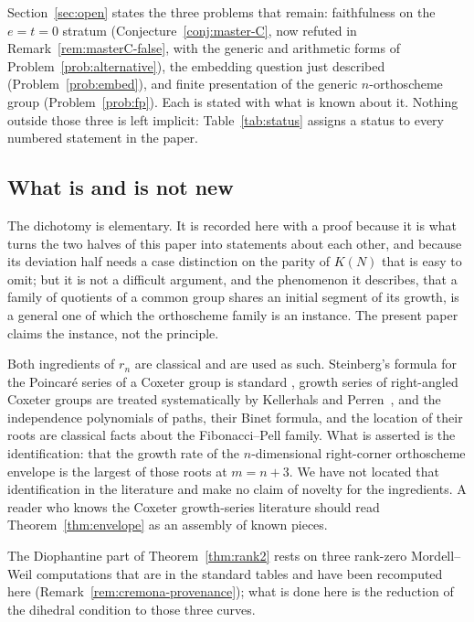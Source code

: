 \documentclass[11pt,a4paper]{article}
\theoremstyle{definition}
\theoremstyle{remark}
\theoremstyle{plain}
\begin{document}
Section~\ref{sec:open} states the three problems that remain: faithfulness on the $e=t=0$
stratum (Conjecture~\ref{conj:master-C}, now refuted in Remark~\ref{rem:masterC-false}, with
the generic and arithmetic forms of Problem~\ref{prob:alternative}), the embedding question
just described
(Problem~\ref{prob:embed}), and finite presentation of the generic $n$-orthoscheme group
(Problem~\ref{prob:fp}). Each is stated with what is known about it. Nothing outside those
three is left implicit: Table~\ref{tab:status} assigns a status to every numbered statement in
the paper.

\subsection{What is and is not new}

The dichotomy is elementary. It is recorded here with a proof because it is what turns the two
halves of this paper into statements about each other, and because its deviation half needs a
case distinction on the parity of $K(N)$ that is easy to omit; but it is not a difficult
argument, and the phenomenon it describes, that a family of quotients of a common group shares
an initial segment of its growth, is a general one of which the orthoscheme family is an
instance. The present paper claims the instance, not the principle.

Both ingredients of $r_n$ are classical and are used as such. Steinberg's formula for the
Poincar\'e series of a Coxeter group is standard \cite{Steinberg,humphreys90,Bourbaki}, growth
series of right-angled Coxeter groups are treated systematically by Kellerhals and
Perren~\cite{kellerhals-perren}, and the independence polynomials of paths, their Binet formula,
and the location of their roots are classical facts about the Fibonacci--Pell family. What is
asserted is the identification: that the growth rate of the $n$-dimensional right-corner
orthoscheme envelope is the largest of those roots at $m=n+3$. We have not located that
identification in the literature and make no claim of novelty for the ingredients. A reader who
knows the Coxeter growth-series literature should read Theorem~\ref{thm:envelope} as an assembly
of known pieces.

The Diophantine part of Theorem~\ref{thm:rank2} rests on three rank-zero Mordell--Weil
computations that are in the standard tables \cite{cremona-1997,lmfdb-24a1,lmfdb-72a2} and have
been recomputed here (Remark~\ref{rem:cremona-provenance}); what is done here is the reduction
of the dihedral condition to those three curves.
\end{document}

